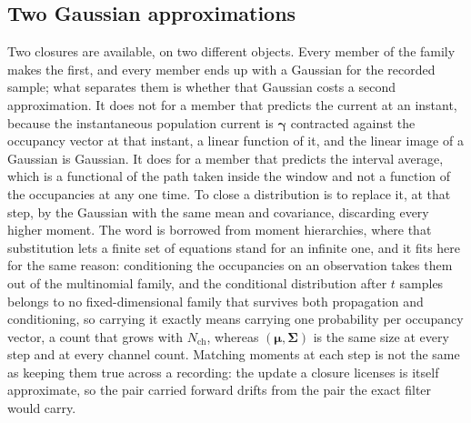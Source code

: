 \subsection*{Two Gaussian approximations}

Two closures are available, on two different objects. Every member of the family makes the
first, and every member ends up with a Gaussian for the recorded sample; what separates
them is whether that Gaussian costs a second approximation. It does not for a member that
predicts the current at an instant, because the instantaneous population current is
$\bm{\gamma}$ contracted against the occupancy vector at that instant, a linear function of
it, and the linear image of a Gaussian is Gaussian. It does for a member that predicts the interval
average, which is a functional of the path taken inside the window and not a function of
the occupancies at any one time. To close a
distribution is to replace it, at that step, by the Gaussian with the same mean and
covariance, discarding every higher moment. The word is borrowed from moment hierarchies,
where that substitution lets a finite set of equations stand for an infinite one, and it
fits here for the same reason: conditioning the occupancies on an observation takes them
out of the multinomial family, and the conditional distribution after $t$ samples belongs
to no fixed-dimensional family that survives both propagation and conditioning, so carrying
it exactly means carrying one probability per occupancy vector, a count that grows with
$N_{\mathrm{ch}}$, whereas $(\bm{\mu},\bm{\Sigma})$ is the same size at every step and at
every channel count. Matching moments at each step is not the same as keeping them true
across a recording: the update a closure licenses is itself approximate, so the pair carried
forward drifts from the pair the exact filter would carry.

